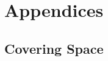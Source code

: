 \chapter*{Appendices}
\setcounter{section}{0}
\renewcommand\thesection{\Alph{section}}

\section{Covering Space}

